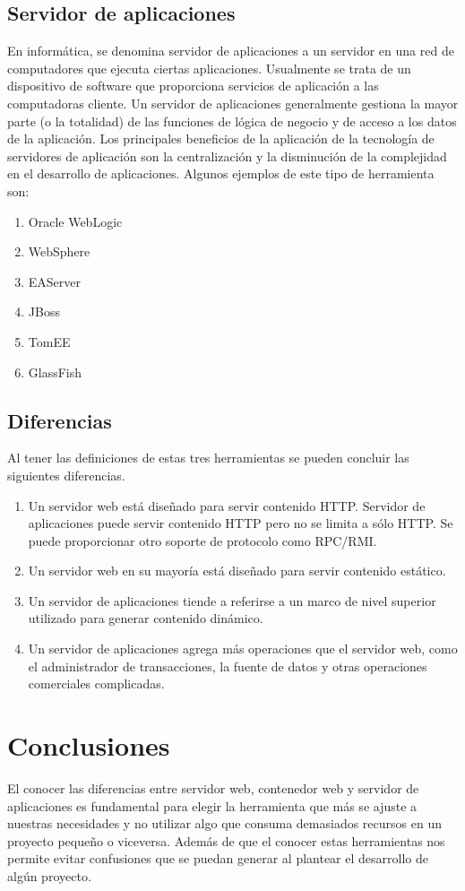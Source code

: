 \documentclass[a4paper,12pt]{article}
\begin{document}
\subsection{Servidor de aplicaciones}
En informática, se denomina servidor de aplicaciones a un servidor en una red de 
computadores que ejecuta ciertas aplicaciones. Usualmente se trata de 
un dispositivo de software que proporciona servicios de aplicación a las 
computadoras cliente. Un servidor de aplicaciones generalmente gestiona la mayor 
parte (o la totalidad) de las funciones de lógica de negocio y de acceso a los 
datos de la aplicación. Los principales beneficios de la aplicación de la 
tecnología de servidores de aplicación son la centralización y la disminución de 
la complejidad en el desarrollo de aplicaciones.
Algunos ejemplos de este tipo de herramienta son:
\begin{enumerate}
 \item Oracle WebLogic
 \item WebSphere
 \item EAServer
 \item JBoss
 \item TomEE
 \item GlassFish
\end{enumerate}

\subsection{Diferencias}
Al tener las definiciones de estas tres herramientas se pueden concluir
las siguientes diferencias.

\begin{enumerate}
 \item Un servidor web está diseñado para servir contenido HTTP. Servidor de 
aplicaciones puede servir contenido HTTP pero no se limita a sólo HTTP. Se puede 
proporcionar otro soporte de protocolo como RPC/RMI.
 \item Un servidor web en su mayoría está diseñado para servir contenido estático.
 \item Un servidor de aplicaciones tiende a referirse a un marco de nivel superior utilizado para generar contenido dinámico.
 \item Un servidor de aplicaciones agrega más operaciones que el servidor web, como el administrador de transacciones, la fuente de datos y otras operaciones comerciales complicadas.
\end{enumerate}


\section{Conclusiones}
El conocer las diferencias entre servidor web, contenedor web y servidor de 
aplicaciones es fundamental para elegir la herramienta que más se ajuste a 
nuestras necesidades y no utilizar algo que consuma demasiados recursos en un 
proyecto pequeño o viceversa. Además de que el conocer estas herramientas nos 
permite evitar confusiones que se puedan generar al plantear el desarrollo de 
algún proyecto.



\end{document}
